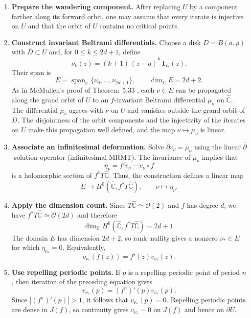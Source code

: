 \documentclass[letterpaper]{amsart}
\numberwithin{equation}{section}
\numberwithin{figure}{section}
\theoremstyle{plain}
\theoremstyle{definition}
\newcommand{\C}{\mathbb{C}}
\newcommand{\Sphere}{\widehat{\mathbb{C}}}
\begin{document}
\begin{enumerate}[label=\textbf{Step \arabic*.},leftmargin=*]
\item \textbf{Prepare the wandering component.} After replacing $U$ by a component farther along its forward orbit, one may assume that every iterate is injective on $U$ and that the orbit of $U$ contains no critical points.

\item \textbf{Construct invariant Beltrami differentials.} Choose a disk $D=B(a,\rho)$ with $\overline D\subset U$ and, for $0\leq k\leq2d+1$, define
\[
  \nu_k(z)=(k+1)\,\overline{(z-a)}^k\,\mathbf{1}_D(z).
\]
Their span is
\[
  E=\operatorname{span}_{\C}\{\nu_0,\ldots,\nu_{2d+1}\}, \qquad \dim_{\C}E=2d+2.
\]
As in McMullen's proof of Theorem~5.33 \cite{McMullen}, each $\nu\in E$ can be propagated along the grand orbit of $U$ to an $f$-invariant Beltrami differential $\mu_\nu$ on $\Sphere$. The differential $\mu_\nu$ agrees with $\nu$ on $U$ and vanishes outside the grand orbit of $D$. The disjointness of the orbit components and the injectivity of the iterates on $U$ make this propagation well defined, and the map $\nu\mapsto\mu_\nu$ is linear.

\item \textbf{Associate an infinitesimal deformation.} Solve $\bar\partial v_\nu=\mu_\nu$ using the linear $\bar\partial$-solution operator (infinitesimal MRMT). The invariance of $\mu_\nu$ implies that
\[
  \eta_\nu=f'v_\nu-v_\nu\circ f
\]
is a holomorphic section of $f^*T\Sphere$. Thus, the construction defines a linear map
\[
  E\longrightarrow H^0(\Sphere,f^*T\Sphere),
  \qquad \nu\longmapsto\eta_\nu.
\]

\item \textbf{Apply the dimension count.} Since $T\Sphere\simeq\mathcal O(2)$ and $f$ has degree $d$, we have $f^*T\Sphere\simeq\mathcal O(2d)$ and therefore
\[
  \dim_{\C}H^0(\Sphere,f^*T\Sphere)=2d+1.
\]
The domain $E$ has dimension $2d+2$, so rank--nullity gives a nonzero $\nu_*\in E$ for which $\eta_{\nu_*}=0$. Equivalently,
\[
  v_{\nu_*}(f(z))=f'(z)v_{\nu_*}(z).
\]

\item \textbf{Use repelling periodic points.} If $p$ is a repelling periodic point of period $n$, then iteration of the preceding equation gives
\[
  v_{\nu_*}(p)=(f^n)'(p)v_{\nu_*}(p).
\]
Since $|(f^n)'(p)|>1$, it follows that $v_{\nu_*}(p)=0$. Repelling periodic points are dense in $J(f)$, so continuity gives $v_{\nu_*}=0$ on $J(f)$ and hence on $\partial U$.


\end{enumerate}
\end{document}
